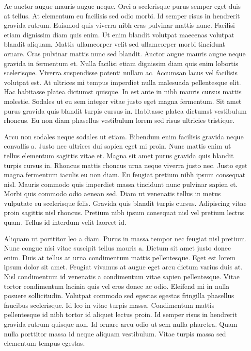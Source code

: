 \documentclass[11pt,a4paper]{article}
\begin{document}
Ac auctor augue mauris augue neque. Orci a scelerisque purus semper eget duis at tellus. At elementum eu facilisis sed odio morbi. Id semper risus in hendrerit gravida rutrum. Euismod quis viverra nibh cras pulvinar mattis nunc. Facilisi etiam dignissim diam quis enim. Ut enim blandit volutpat maecenas volutpat blandit aliquam. Mattis ullamcorper velit sed ullamcorper morbi tincidunt ornare. Cras pulvinar mattis nunc sed blandit. Auctor augue mauris augue neque gravida in fermentum et. Nulla facilisi etiam dignissim diam quis enim lobortis scelerisque. Viverra suspendisse potenti nullam ac. Accumsan lacus vel facilisis volutpat est. At ultrices mi tempus imperdiet nulla malesuada pellentesque elit. Hac habitasse platea dictumst quisque. In est ante in nibh mauris cursus mattis molestie. Sodales ut eu sem integer vitae justo eget magna fermentum. Sit amet purus gravida quis blandit turpis cursus in. Habitasse platea dictumst vestibulum rhoncus. Eu non diam phasellus vestibulum lorem sed risus ultricies tristique.

Arcu non sodales neque sodales ut etiam. Bibendum enim facilisis gravida neque convallis a. Justo nec ultrices dui sapien eget mi proin. Nunc mattis enim ut tellus elementum sagittis vitae et. Magna sit amet purus gravida quis blandit turpis cursus in. Rhoncus mattis rhoncus urna neque viverra justo nec. Justo eget magna fermentum iaculis eu non diam. Eu feugiat pretium nibh ipsum consequat nisl. Mauris commodo quis imperdiet massa tincidunt nunc pulvinar sapien et. Morbi quis commodo odio aenean sed. Diam ut venenatis tellus in metus vulputate eu scelerisque felis. Gravida quis blandit turpis cursus. Adipiscing vitae proin sagittis nisl rhoncus. Pretium nibh ipsum consequat nisl vel pretium lectus quam. Tellus id interdum velit laoreet id.

Aliquam ut porttitor leo a diam. Purus in massa tempor nec feugiat nisl pretium. Nunc congue nisi vitae suscipit tellus mauris a. Dictum sit amet justo donec enim. Duis at tellus at urna condimentum mattis pellentesque. Eget est lorem ipsum dolor sit amet. Feugiat vivamus at augue eget arcu dictum varius duis at. Nisl condimentum id venenatis a condimentum vitae sapien pellentesque. Vitae tortor condimentum lacinia quis vel eros donec ac odio. Eleifend mi in nulla posuere sollicitudin. Volutpat commodo sed egestas egestas fringilla phasellus faucibus scelerisque. Id leo in vitae turpis massa. Condimentum mattis pellentesque id nibh tortor id aliquet lectus proin. Id semper risus in hendrerit gravida rutrum quisque non. Id ornare arcu odio ut sem nulla pharetra. Quam nulla porttitor massa id neque aliquam vestibulum. Vitae turpis massa sed elementum tempus egestas.
\end{document}
